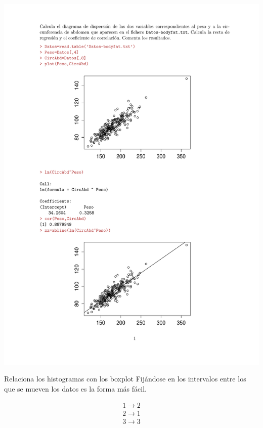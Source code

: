 \newpage
\begin{problem}[6]
\solution
\centerline{\includegraphics[page=1,scale=0.783]{pdf/_Solucion_T1P6.pdf}} %

\end{problem}
\newpage

\begin{problem}[7]
Relaciona los histogramas con los boxplot
\solution
Fijándose en los intervalos entre los que se mueven los datos es la forma más fácil.

\[\begin{array}{cc}
1 \to 2\\
2 \to 1\\
3 \to 3
\end{array}\]

\end{problem}

